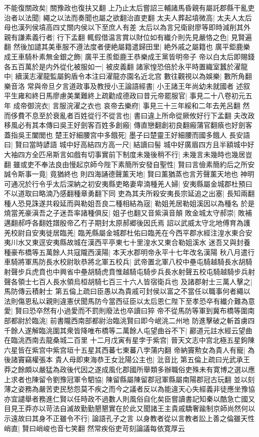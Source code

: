 不能復關政矣|{
	關豫政也復扶又翻}
上乃止太后嘗詔三輔諸馬昏親有屬託郡縣干亂吏治者以法聞|{
	繩之以法而奏聞也屬之欲翻治直吏翻}
太夫人葬起墳微高|{
	太夫人太后母也漢列侯墳高四丈關内侯以下至庶人有差}
太后以為言兄衛尉廖等即時減削其外親有謙素義行者|{
	行下孟翻}
輒假借温言賞以財位如有纎介則先見嚴恪之色|{
	見賢遍翻}
然後加譴其美車服不遵法度者便絶屬籍遣歸田里|{
	絶外戚之屬籍也}
廣平鉅鹿樂成王車騎朴素無金銀之飾|{
	廣平王羨鉅鹿王恭樂成王黨皆明帝子}
帝以白太后即賜錢各五百萬於是内外從化被服如一|{
	被皮義翻}
諸家惶恐倍於永平時置織室蠶於濯龍中|{
	續漢志濯龍監屬鉤盾令本注曰濯龍亦園名近北宫}
數往觀視以為娛樂|{
	數所角翻樂音洛}
常與帝旦夕言道政事及教授小王論語經書|{
	小王諸王年尚幼未就國者}
述叙平生雍和終日馬廖慮美業難終上疏勸成德政曰昔元帝罷服官|{
	事見二十八卷初元五年}
成帝御浣衣|{
	言服浣濯之衣也}
哀帝去樂府|{
	事見三十三年綏和二年去羌呂翻}
然而侈費不息至於衰亂者百姓從行不從言也|{
	書曰違上所命從厥攸好行下孟翻}
夫改政移風必有其本傳曰吳王好劍客百姓多創瘢|{
	傳直戀翻創初良翻瘢蒲官翻㾗也好劍客蓋指吳王闔閭也}
楚王好細腰宫中多餓死|{
	墨子曰楚靈王好細腰而國多餓人}
長安語曰|{
	賢曰當時諺語}
城中好高結四方高一尺|{
	結讀曰髻}
城中好廣眉四方且半額城中好大袖四方全匹帛斯言如戲有切事實前下制度未幾後稍不行|{
	未幾言未幾時也幾居豈翻}
雖或吏不奉法良由慢起京師今陛下素簡所安發自聖性|{
	賢曰言儉素簡約后之所安}
誠令斯事一竟|{
	竟猶終也}
則四海誦德聲薰天地|{
	賢曰薰猶蒸也言芳聲薰天地也}
神明可通况於行令乎太后深納之初安夷縣吏略妻卑湳種羌人婦|{
	安夷縣屬金城郡杜預曰不以道取曰略湳乃感翻種章勇翻下同}
吏為其夫所殺安夷長宗延追之出塞|{
	長知兩翻}
種人恐見誅遂共殺延而與勒姐吾良二種相結為宼|{
	勒姐羌居勒姐溪因以為種名}
於是燒當羌豪滇吾之子迷吾率諸種俱反|{
	姐子也翻又音紫滇音顛}
敗金城太守郝崇|{
	敗補邁翻郝呼各翻姓譜殷帝乙冇子期封太原郝郷後因氏焉}
詔以武威太守北地傅育為護羌校尉自安夷徙居臨羌|{
	臨羌縣屬金城郡杜佑曰臨羌在今西平郡水經注湟水東合安夷川水又東逕安夷縣故城在漢西平亭東七十里湟水又東合勒姐溪水}
迷吾又與封養種豪布橋等五萬餘人共寇隴西漢陽|{
	本天水郡明帝永平十七年改名漢陽}
秋八月遣行車騎將軍馬防長水校尉耿恭將北軍五校兵|{
	武帝置北軍八校中壘屯騎越騎長水胡騎射聲步兵虎賁也中興省中壘胡騎虎賁惟越騎屯騎步兵長水射聲五校屯騎越騎步兵射聲各領士七百人長水領烏桓胡騎七百三十六人皆宿衛兵也}
及諸郡射士三萬人擊之|{
	馬防傳云積射士}
第五倫上疏曰臣愚以為貴戚可封侯以富之不當任以職事何者繩以法則傷恩私以親則違憲伏聞馬防今當西征臣以太后恩仁陛下至孝恐卒有纎介難為意愛|{
	賢曰恐卒然有小過愛而不罰則廢法也卒讀曰猝}
帝不從馬防等軍到冀布橋等圍南部都尉於臨洮|{
	前書隴西南部都尉治臨洮賢曰即今岷洮二州地}
防進擊破之斬首虜四千餘人遂解臨洮圍其衆皆降唯布橋等二萬餘人屯望曲谷不下|{
	酈道元註水經云望曲在臨洮西南去龍桑城二百里}
十二月戊寅有星孛于紫宫|{
	晉天文志中宫北極五星鉤陳六星皆在紫宫中紫宫垣十五星其西蕃七東蕃八孛蒲内翻}
帝納竇勲女為貴人有寵|{
	為後諸竇竊權張本}
貴人母即東海恭王女沘陽公主也|{
	沘音比}
第五倫上疏曰光武承王莽之餘頗以嚴猛為政後代因之遂成風化郡國所舉類多辦職俗吏殊未有寛博之選以應上求者也陳留令劉豫冠軍令駟協|{
	陳留縣屬陳留郡冠軍縣屬南陽郡冠古玩翻}
並以刻薄之姿務為嚴苦吏民愁怨莫不疾之而今之議者反以為能違天心失經義非徒應坐豫協亦宜譴舉者務進仁賢以任時政不過數人則風俗自化矣臣嘗讀書記知秦以酷急亡國又目見王莽亦以苛法自滅故勤勤懇懇實在於此又聞諸王主貴戚驕奢踰制京師尚然何以示遠故曰其身不正雖令不行|{
	論語孔子之言}
以身教者從以言教者訟上善之倫雖天性峭直|{
	賢曰峭峻也音七笑翻}
然常疾俗吏苛刻論議每依寛厚云

